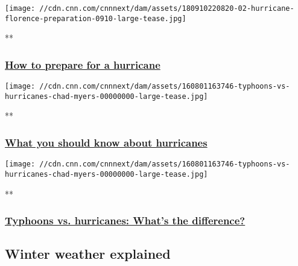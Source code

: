 \href{/videos/weather/2016/08/29/orig-weather-preparing-for-a-hurricane.cnn}{}

\texttt{[image: //cdn.cnn.com/cnnnext/dam/assets/180910220820-02-hurricane-florence-preparation-0910-large-tease.jpg]}

**

\hypertarget{how-to-prepare-for-a-hurricane}{%
\subsubsection{\texorpdfstring{\href{/videos/weather/2016/08/29/orig-weather-preparing-for-a-hurricane.cnn}{How
to prepare for a
hurricane}}{How to prepare for a hurricane}}\label{how-to-prepare-for-a-hurricane}}

\href{/videos/weather/2019/05/31/hurricane-facts-orig-llr.cnn}{}

\texttt{[image: //cdn.cnn.com/cnnnext/dam/assets/160801163746-typhoons-vs-hurricanes-chad-myers-00000000-large-tease.jpg]}

**

\hypertarget{what-you-should-know-about-hurricanes}{%
\subsubsection{\texorpdfstring{\href{/videos/weather/2019/05/31/hurricane-facts-orig-llr.cnn}{What
you should know about
hurricanes}}{What you should know about hurricanes}}\label{what-you-should-know-about-hurricanes}}

\href{/videos/weather/2016/08/01/typhoons-vs-hurricanes-chad-myers.cnn}{}

\texttt{[image: //cdn.cnn.com/cnnnext/dam/assets/160801163746-typhoons-vs-hurricanes-chad-myers-00000000-large-tease.jpg]}

**

\hypertarget{typhoons-vs-hurricanes-whats-the-difference}{%
\subsubsection{\texorpdfstring{\href{/videos/weather/2016/08/01/typhoons-vs-hurricanes-chad-myers.cnn}{Typhoons
vs. hurricanes: What's the
difference?}}{Typhoons vs. hurricanes: What's the difference?}}\label{typhoons-vs-hurricanes-whats-the-difference}}

\hypertarget{winter-weather-explained}{%
\subsection{Winter weather explained}\label{winter-weather-explained}}

